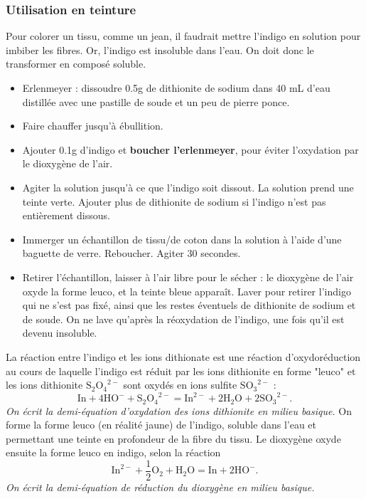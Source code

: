 \documentclass[11pt,a4paper]{report}
\begin{document}
\subsubsection{Utilisation en teinture}

Pour colorer un tissu, comme un jean, il faudrait mettre l'indigo en solution pour imbiber les fibres. Or, l'indigo est insoluble dans l'eau. On doit donc le transformer en composé soluble.

\begin{itemize}
	\item Erlenmeyer : dissoudre 0.5g de dithionite de sodium dans 40 mL d'eau distillée avec une 				pastille de soude et un peu de pierre ponce.
	\item Faire chauffer jusqu'à ébullition.
	\item Ajouter 0.1g d'indigo et \textbf{boucher l'erlenmeyer}, pour éviter l'oxydation par le 				dioxygène de l'air.
	\item Agiter la solution jusqu'à ce que l'indigo soit dissout. La solution prend une 						teinte verte. Ajouter plus de dithionite de sodium si l'indigo n'est pas entièrement dissous.
	\item Immerger un échantillon de tissu/de coton dans la solution à l'aide d'une baguette de verre. 			Reboucher. Agiter 30 secondes. 
	\item Retirer l'échantillon, laisser à l'air libre pour le sécher : le dioxygène de l'air oxyde la 			forme leuco, et la teinte bleue apparaît. Laver pour retirer l'indigo qui ne s'est pas fixé, 			ainsi que les restes éventuels de dithionite de sodium et de soude. On ne lave qu'après la 				réoxydation de l'indigo, une fois qu'il est devenu insoluble.\\
	\end{itemize}

La réaction entre l'indigo et les ions dithionate est une réaction d'oxydoréduction au cours de laquelle l'indigo est réduit par les ions dithionite en forme "leuco" et les ions dithionite 
${\text{S}_2\text{O}_4}^{2-}$ sont oxydés en ions sulfite ${\text{SO}_3}^{2-}$ :
	\begin{equation}
		\text{In} + 4\text{HO}^- + {\text{S}_2\text{O}_4}^{2-} 
		= \text{In}^{2-} + 2\text{H}_2\text{O} + 2{\text{SO}_3}^{2-}.
	\end{equation}
\textit{On écrit la demi-équation d'oxydation des ions dithionite en milieu basique.}
On forme la forme leuco (en réalité jaune) de l'indigo, soluble dans l'eau et permettant une teinte en profondeur de la fibre du tissu. Le dioxygène oxyde ensuite la forme leuco en indigo, selon la réaction
\begin{equation}
	\text{In}^{2-} + \frac{1}{2}\text{O}_2 + \text{H}_2\text{O} = \text{In} + 2\text{HO}^{-}.
\end{equation}
\textit{On écrit la demi-équation de réduction du dioxygène en milieu basique.}
\end{document}
